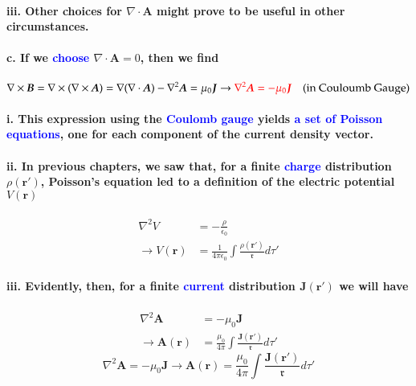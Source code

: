 \documentclass{article}
\begin{document}
\paragraph{\indent\indent iii. Other choices for $\nabla \cdot \boldsymbol{A}$ might prove to be useful in other circumstances.}
\paragraph{\indent c. If we \textcolor{blue}{choose} $\nabla\cdot\boldsymbol{A}=0$, then we find}
\begin{equation*}
    \nabla\times\boldsymbol{B}=\nabla\times(\nabla\times\boldsymbol{A})=\nabla(\nabla\cdot\boldsymbol{A})-\nabla^2\boldsymbol{A}=\mu_0\boldsymbol{J}\rightarrow \textcolor{red}{\nabla^2\boldsymbol{A}=-\mu_0\boldsymbol{J}} \quad\text{(in Couloumb Gauge)}
\end{equation*}
\paragraph{\indent\indent i. This expression using the \textcolor{blue}{Coulomb gauge} yields \textcolor{blue}{a set of Poisson equations}, one for each component of the current density vector.}
\paragraph{\indent\indent ii. In previous chapters, we saw that, for a finite \textcolor{blue}{charge} distribution $\rho(\boldsymbol{r}')$, Poisson's equation led to a definition of the electric potential $V(\boldsymbol{r})$}
\begin{align*}
    \nabla^2V&=-\frac{\rho}{\epsilon_0}\\
    \rightarrow V(\boldsymbol{r})&=\frac{1}{4\pi\epsilon_0}\int\frac{\rho(\boldsymbol{r}')}{\mathfrak{r}}d\tau'
\end{align*}
\paragraph{\indent\indent iii. Evidently, then, for a finite \textcolor{blue}{current} distribution $\boldsymbol{J}(\boldsymbol{r}')$ we will have}
\begin{align*}
    \nabla^2\boldsymbol{A}&=-\mu_0\boldsymbol{J}\\
    \rightarrow \boldsymbol{A}(\boldsymbol{r})&=\frac{\mu_0}{4\pi}\int\frac{\boldsymbol{J}(\boldsymbol{r}')}{\mathfrak{r}}d\tau'
\end{align*}
\begin{equation*}
    \nabla^2\boldsymbol{A}=-\mu_0\boldsymbol{J}\longrightarrow\boldsymbol{A}(\boldsymbol{r})=\frac{\mu_0}{4\pi}\int\frac{\boldsymbol{J}(\boldsymbol{r}')}{\mathfrak{r}}d\tau'
\end{equation*}
\end{document}
